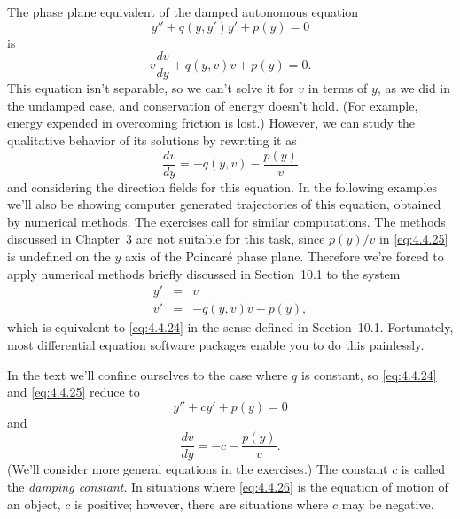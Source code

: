 
\noindent
The phase plane equivalent of the damped autonomous equation
\begin{equation}
  \label{eq:4.4.24}y''+q(y,y')y'+p(y)=0
\end{equation}
is
\[
  v\frac{dv}{dy}+q(y,v)v+p(y)=0.
\]
This equation isn't separable, so we can't solve it for $v$ in terms of $y$, as we did in the
undamped case, and conservation of energy doesn't hold. (For example, energy expended in overcoming
friction is lost.) However, we can study the qualitative behavior of its solutions by rewriting it
as
\begin{equation}
  \label{eq:4.4.25}\frac{dv}{dy}=-q(y,v)-\frac{p(y)}{v}
\end{equation}
and considering the direction fields for this equation. In the following examples we'll also be
showing computer generated trajectories of this equation, obtained by numerical methods. The
exercises call for similar computations. The methods discussed in Chapter~3 are not suitable for
this task, since $p(y)/v$ in \eqref{eq:4.4.25} is undefined on the $y$ axis of the Poincar\'e phase
plane. Therefore we're forced to apply numerical methods briefly discussed in Section~10.1 to the
system
\begin{eqnarray*}
  y' & = & v \\
  v' & = & -q(y,v)v-p(y),
\end{eqnarray*}
which is equivalent to \eqref{eq:4.4.24} in the sense defined in Section~10.1. Fortunately, most
differential equation software packages enable you to do this painlessly.

In the text we'll confine ourselves to the case where $q$ is constant, so \eqref{eq:4.4.24} and
\eqref{eq:4.4.25} reduce to
\begin{equation}
  \label{eq:4.4.26}y''+cy'+p(y)=0
\end{equation}
and
\[
  \frac{dv}{dy}=-c-\frac{p(y)}{v}.
\]
(We'll consider more general equations in the exercises.) The constant $c$ is called the
{\color{blue}\it damping constant\/}. In situations where \eqref{eq:4.4.26} is the equation of
motion of an object, $c$ is positive; however, there are situations where $c$ may be negative.


